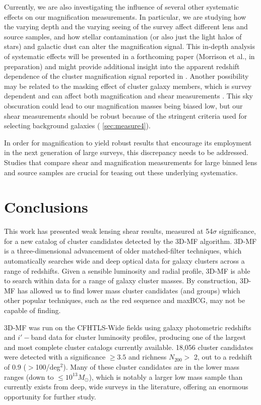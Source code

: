 Currently, we are also investigating the influence of several other systematic effects on our magnification measurements. In particular, we are studying how the varying depth and the varying seeing of the survey affect different lens and source samples, and how stellar contamination (or also just the light halos of stars) and galactic dust can alter the magnification signal. This in-depth analysis of systematic effects will be presented in a forthcoming paper (Morrison et al., in preparation) and might provide additional insight into the apparent redshift dependence of the cluster magnification signal reported in \citet{Ford14}. Another possibility may be related to the masking effect of cluster galaxy members, which is survey dependent and can affect both magnification and shear measurements \citep{Simet14}. This sky obscuration could lead to our magnification masses being biased low, but our shear measurements should be robust because of the stringent criteria used for selecting background galaxies ( \autoref{sec:measure4}).

In order for magnification to yield robust results that encourage its employment in the next generation of large surveys, this discrepancy needs to be addressed. Studies that compare shear and magnification measurements for large binned lens and source samples are crucial for teasing out these underlying systematics. 


\section{Conclusions}
\label{sec:conc4}

This work has presented weak lensing shear results, measured at 54$\sigma$ significance, for a new catalog of cluster candidates detected by the \ac{3D-MF} algorithm. \ac{3D-MF} is a three-dimensional advancement of older matched-filter techniques, which automatically searches wide and deep optical data for galaxy clusters across a range of redshifts. Given a sensible luminosity and radial profile, \ac{3D-MF} is able to search within data for a range of galaxy cluster masses. By construction, \ac{3D-MF} has allowed us to find lower mass cluster candidates (and groups) which other popular techniques, such as the red sequence and maxBCG, may not be capable of finding. 

\ac{3D-MF} was run on the \ac{CFHTLS}-Wide fields using galaxy photometric redshifts and $i'-$band data for cluster luminosity profiles, producing one of the largest and most complete cluster catalogs currently available. 18,056 cluster candidates were detected with a significance $\ge 3.5$ and richness $N_{200} >$ 2, out to a redshift of 0.9 ($>$100/deg$^2$). Many of these cluster candidates are in the lower mass ranges (down to $\leq 10^{13} M_{\odot}$), which is notably a larger low mass sample than currently exists from deep, wide surveys in the literature, offering an enormous opportunity for further study. 

